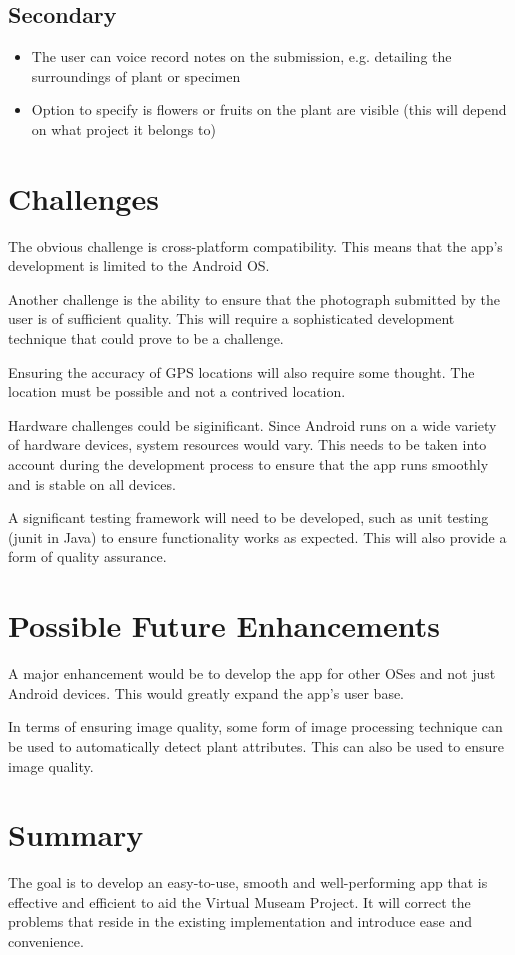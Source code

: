\documentclass[12pt,a4paper,oneside]{report}
\begin{document}
\subsection{Secondary}
    \begin{itemize}
      \item The user can voice record notes on the submission, e.g. detailing the surroundings of plant or specimen
      \item Option to specify is flowers or fruits on the plant are visible (this will depend on what project it belongs to)
    \end{itemize}
\section{Challenges}
  \begin{spacing}{1.4}
    The obvious challenge is cross-platform compatibility. This means that the app's development is limited to the Android OS.

    Another challenge is the ability to ensure that the photograph submitted by the user is of sufficient quality. This will require a sophisticated development technique that could prove to be a challenge.

    Ensuring the accuracy of GPS locations will also require some thought. The location must be possible and not a contrived location.

    Hardware challenges could be siginificant. Since Android runs on a wide variety of hardware devices, system resources would vary. This needs to be taken into account during the development process to ensure that the app runs smoothly and is stable on all devices.

    A significant testing framework will need to be developed, such as unit testing (junit in Java) to ensure functionality works as expected. This will
    also provide a form of quality assurance.
  \end{spacing}
\section{Possible Future Enhancements}
  \begin{spacing}{1.4}
    A major enhancement would be to develop the app for other OSes and not just Android devices. This would greatly expand the app's user base.

    In terms of ensuring image quality, some form of image processing technique can be used to automatically detect plant attributes. This can also be used to ensure image quality.
  \end{spacing}
\section{Summary}
  The goal is to develop an easy-to-use, smooth and well-performing app that is effective and efficient to aid the Virtual Museam Project.
  It will correct the problems that reside in the existing implementation and introduce ease and convenience. 
\end{document}
